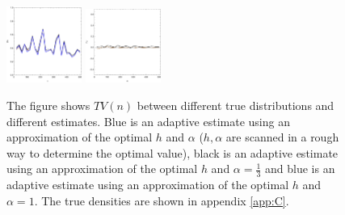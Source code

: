 \documentclass[
twoside,
openright,
titlepage,
numbers=noenddot,
headinclude,%
footinclude=true,
dottedtoc, %
ngerman,
american, %
pagesize=pdftex,
]{book}
\begin{document}
\begin{example}
\begin{figure}[H]
			\includegraphics[width=0.22\textwidth]{figures/2DTVexamples/sn+t1}
			\includegraphics[width=0.22\textwidth]{figures/2DTVexamples/sn+t2}
			\caption{The figure shows $TV(n)$ between different true distributions and different estimates. Blue is an adaptive estimate using an approximation of the optimal $h$ and $\alpha$ ($h,\alpha$ are scanned in a rough way to determine the optimal value), black is an adaptive estimate using an approximation of the optimal $h$ and $\alpha=\frac{1}{3}$ and blue is an adaptive estimate using an approximation of the optimal $h$ and $\alpha=1$. The true densities are shown in appendix \ref{app:C}.}
			\label{fig:e6}
		\end{figure} 

\end{example}
\end{document}
